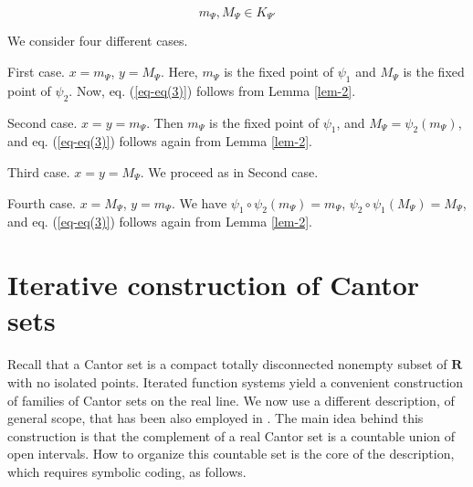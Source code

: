 \documentclass[final,epsfig,amsfont]{article}
\begin{document}
\begin{equation}
m_{\Psi}, M_{\Psi}\in K_{\Psi'} \label{eq-eq(3)}
\end{equation}

We consider four different cases.

First case.  $x=m_{\Psi}$,  $y=M_{\Psi}$. Here, $m_{\Psi}$ is the fixed point of
$\psi_1$ and $M_{\Psi}$ is the fixed point of $\psi_2$. Now, eq. (\ref{eq-eq(3)}) follows from Lemma \ref{lem-2}.

Second case. $x=y=m_{\Psi}$. Then $m_{\Psi}$ is  the fixed point of $\psi_1$, and
$M_{\Psi}=\psi_2(m_{\Psi})$, and eq. (\ref{eq-eq(3)}) follows again from Lemma \ref{lem-2}.

Third case. $x=y=M_{\Psi}$. We proceed as in Second case.

Fourth case.  $x=M_{\Psi}$,  $y=m_{\Psi}$. We have
$\psi_1\circ\psi_2(m_{\Psi})=m_{\Psi}$, $\psi_2\circ\psi_1(M_{\Psi})=M_{\Psi}$, and eq. (\ref{eq-eq(3)})
follows again from Lemma \ref{lem-2}. {\quad \vrule height .9ex width .8ex depth -.1ex}

\section{Iterative construction of Cantor sets}
\label{sec-constr}

Recall that a Cantor set is a compact totally disconnected nonempty subset of ${\mathbf R}$ with no
isolated points. Iterated function systems yield a convenient construction of families of Cantor sets on the real line. We now use a different description, of general scope, that has been also employed in \cite{cabrelli}. The main idea behind this construction is that the complement of a real Cantor set is a countable union of open intervals. How to organize this countable set is the core of the description, which requires symbolic coding, as follows.
\end{document}
